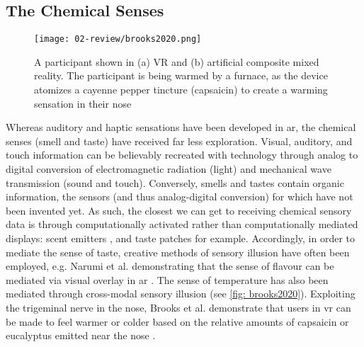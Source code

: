 \subsection{The Chemical Senses}\label{sec: ar-sensory-chemical}
\begin{wrapfigure}{r}{0.45\textwidth}
    \vspace{-\intextsep}
    \hfill
    \begin{minipage}{0.95\linewidth}
            \texttt{[image: 02-review/brooks2020.png]}
            \captionsetup{justification=justified}
            \caption{A participant shown in (a) VR and (b) artificial composite mixed reality. The participant is being warmed by a furnace, as the device atomizes a cayenne pepper tincture (capsaicin) to create a warming sensation in their nose \citep[in][]{brooks2020}}\label{fig: brooks2020}
    \end{minipage}
\end{wrapfigure}
Whereas auditory and haptic sensations have been developed in \gls{ar}, the chemical senses (smell and taste) have received far less exploration. Visual, auditory, and touch information can be believably recreated with technology through analog to digital conversion of electromagnetic radiation (light) and mechanical wave transmission (sound and touch). Conversely, smells and tastes contain organic information, the sensors (and thus analog-digital conversion) for which have not been invented yet. As such, the closest we can get to receiving chemical sensory data is through computationally activated rather than computationally mediated displays: scent emitters \citep{maggioni2019}, and taste patches for example. Accordingly, in order to mediate the sense of taste, creative methods of sensory illusion have often been employed, e.g. Narumi et al. demonstrating that the sense of flavour can be mediated via visual overlay in \gls{ar} \citeyearpar{narumi2011}. The sense of temperature has also been mediated through cross-modal sensory illusion (see \autoref{fig: brooks2020}). Exploiting the trigeminal nerve in the nose, Brooks et al. demonstrate that users in \gls{vr} can be made to feel warmer or colder based on the relative amounts of capsaicin or eucalyptus emitted near the nose \citeyearpar{brooks2020}.



